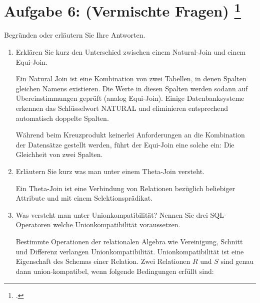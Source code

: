 \documentclass{lehramt-informatik-aufgabe}
\begin{document}
\section{Aufgabe 6: (Vermischte Fragen)
\footcite[Thema 2 Teilaufgabe 2 Aufgabe 6]{66116:2019:09}}

Begründen oder erläutern Sie Ihre Antworten.

\begin{enumerate}

%

\item Erklären Sie kurz den Unterschied zwischen einem
Natural-Join und einem Equi-Join.

\begin{antwort}
Ein Natural Join ist eine Kombination von zwei Tabellen, in denen
Spalten gleichen Namens existieren. Die Werte in diesen Spalten werden
sodann auf Übereinstimmungen geprüft (analog Equi-Join). Einige
Datenbanksysteme erkennen das Schlüsselwort NATURAL und eliminieren
entsprechend automatisch doppelte Spalten.

Während beim Kreuzprodukt keinerlei Anforderungen an die Kombination der
Datensätze gestellt werden, führt der Equi-Join eine solche ein: Die
Gleichheit von zwei Spalten.

\end{antwort}

%

\item Erläutern Sie kurz was man unter einem
Theta-Join versteht.

\begin{antwort}
Ein Theta-Join ist eine Verbindung von Relationen bezüglich beliebiger
Attribute und mit einem Selektionsprädikat.
\end{antwort}

%

\item Was versteht man unter Unionkompatibilität? Nennen Sie drei
SQL-Operatoren welche Unionkompatibilität voraussetzen.

\begin{antwort}
Bestimmte Operationen der relationalen Algebra wie Vereinigung,
Schnitt und Differenz verlangen Unionkompatibilität.
Unionkompatibilität ist eine Eigenschaft des Schemas einer Relation.
Zwei Relationen $R$ und $S$ sind genau dann union-kompatibel, wenn
folgende Bedingungen erfüllt sind:


\end{antwort}
\end{enumerate}
\end{document}
